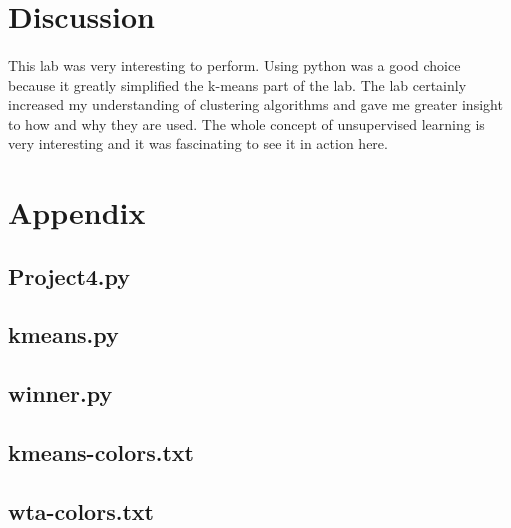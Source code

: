 \documentclass{article}
\begin{document}
\section*{Discussion}
\paragraph{}
This lab was very interesting to perform. Using python was a good
choice because it greatly simplified the k-means part of the lab.
The lab certainly increased my understanding of clustering algorithms 
and gave me greater insight to how and why they are used. The whole
concept of unsupervised learning is very interesting and it was fascinating
to see it in action here.
\newpage


\appendix
\section*{Appendix}
\subsection*{Project4.py}

\newpage
\subsection*{kmeans.py}

\newpage
\subsection*{winner.py}

\newpage
\subsection*{kmeans-colors.txt}

\newpage
\subsection*{wta-colors.txt}

\end{document}
